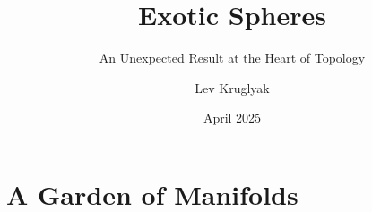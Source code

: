 \documentclass{lkx_thesis}
\title{Exotic Spheres}
\subtitle{An Unexpected Result at the Heart of Topology}
\author{Lev Kruglyak}
\date{April 2025}
\begin{document}


\lkxtoc



\part{A Garden of Manifolds}





%
% 
% 
% 


\lkxrefs
\lkxindex
\end{document}
